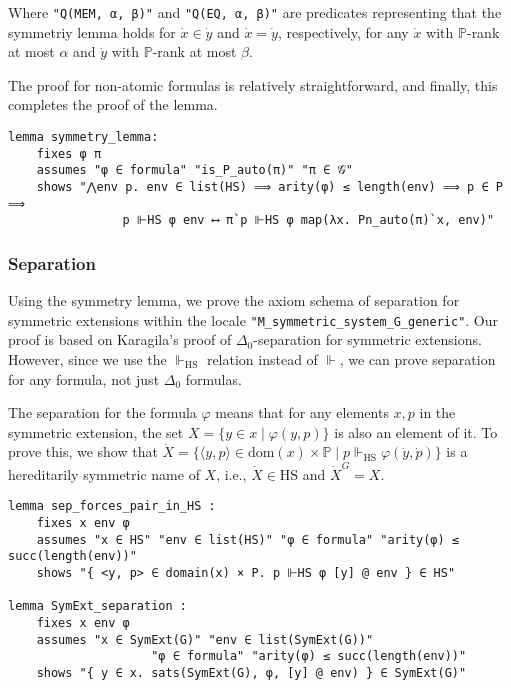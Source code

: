 \documentclass{report}
\newenvironment{isaframe}{\begin{mdframed}[topline=false, rightline=false, bottomline=false]}{\end{mdframed}}
\begin{document}
Where \texttt{"Q(MEM, α, β)"} and \texttt{"Q(EQ, α, β)"} are predicates 
representing that the symmetriy lemma holds for $\dot{x} \in \dot{y}$ and $\dot{x} = \dot{y}$, respectively,
for any $\dot{x}$ with $\mathbb{P}$-rank at most $\alpha$ and $\dot{y}$ with $\mathbb{P}$-rank at most $\beta$.

The proof for non-atomic formulas is relatively straightforward, and finally, 
this completes the proof of the lemma.

\begin{isaframe}
\begin{verbatim}
lemma symmetry_lemma:
    fixes φ π  
    assumes "φ ∈ formula" "is_P_auto(π)" "π ∈ 𝒢" 
    shows "⋀env p. env ∈ list(HS) ⟹ arity(φ) ≤ length(env) ⟹ p ∈ P ⟹ 
                p ⊩HS φ env ⟷ π`p ⊩HS φ map(λx. Pn_auto(π)`x, env)" 
\end{verbatim}
\end{isaframe}


\subsubsection{Separation}
Using the symmetry lemma, we prove the axiom schema of separation for symmetric extensions 
within the locale \texttt{"M\_symmetric\_system\_G\_generic"}.
Our proof is based on Karagila's proof \cite{karagila} of $\Delta_0$-separation for symmetric extensions.
However, since we use the $\Vdash_{\mathrm{HS}}$ relation instead of $\Vdash$,
we can prove separation for any formula, not just $\Delta_0$ formulas.

The separation for the formula $\varphi$ means that 
for any elements $x, p$ in the symmetric extension, the set $X = \{ y \in x \mid \varphi(y, p) \}$ is also an element of it.
To prove this, we show that 
$\dot{X} = \{ \langle y, p \rangle \in \mathrm{dom}(x) \times \mathbb{P} \mid p \Vdash_{\mathrm{HS}} \varphi(\dot{y}, \dot{p}) \}$ is a hereditarily symmetric name of $X$,
i.e., $\dot{X} \in \mathrm{HS}$ and $\dot{X}^G = X$.

\begin{isaframe}
\begin{verbatim}
lemma sep_forces_pair_in_HS : 
    fixes x env φ
    assumes "x ∈ HS" "env ∈ list(HS)" "φ ∈ formula" "arity(φ) ≤ succ(length(env))" 
    shows "{ <y, p> ∈ domain(x) × P. p ⊩HS φ [y] @ env } ∈ HS"

lemma SymExt_separation : 
    fixes x env φ 
    assumes "x ∈ SymExt(G)" "env ∈ list(SymExt(G))" 
                    "φ ∈ formula" "arity(φ) ≤ succ(length(env))" 
    shows "{ y ∈ x. sats(SymExt(G), φ, [y] @ env) } ∈ SymExt(G)"
\end{verbatim}
\end{isaframe}
\end{document}
